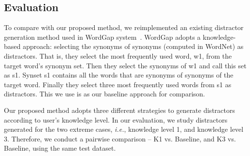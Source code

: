 \subsection{Evaluation}
To compare with our proposed method, we reimplemented an existing distractor generation method used in WordGap system~\cite{Knoop2013}. WordGap adopts a knowledge-based approach: selecting the synonyms of synonyms (computed in WordNet) as distractors. That is, they select the most frequently used word, w1, from the target word's synonym set. %
Then they select the synonyms of w1 and call this set as s1.
Synset s1 contains all the words that are synonyms of synonyms of the target word. Finally they select three most frequently used words from s1 as distractors. This we use is as our baseline approach for comparison.

Our proposed method adopts three different strategies to generate distractors according to user's knowledge level. In our evaluation, we study distractors generated for the two extreme cases, {\it i.e.}, knowledge level 1, and knowledge level 3. Therefore, we conduct a pairwise comparison -- K1  vs. Baseline, and K3  vs. Baseline, using the same test dataset.

%



